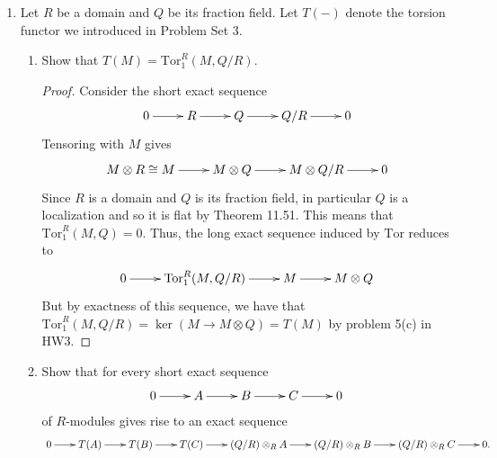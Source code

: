 \documentclass[11pt,oneside,english]{amsart}
\theoremstyle{definition}
\newcommand{\lspace}{\vspace{5mm}}
\newcommand{\Tor}{\text{Tor}}
\begin{document}
\rightline{\today}

\lspace




\begin{enumerate}[leftmargin=*]
\itemsep5mm


\item Let $R$ be a domain and $Q$ be its fraction field. Let $T(-)$ denote the torsion functor we introduced in Problem Set 3. 
\begin{enumerate}
\item Show that $T(M) = \Tor_1^R(M,Q/R)$.%

\begin{proof}
Consider the short exact sequence
\[
\xymatrix{0 \ar[r] & R \ar[r] & Q \ar[r] & Q/R \ar[r] & 0}
\]
Tensoring with $M$ gives
\[
\xymatrix{M\otimes R\cong M \ar[r] & M\otimes Q \ar[r] & M\otimes Q/R \ar[r] & 0}
\]
Since $R$ is a domain and $Q$ is its fraction field, in particular $Q$ is a localization and so it is flat by Theorem 11.51. This means that $\Tor_1^R(M,Q)=0$. Thus, the long exact sequence induced by $\Tor$ reduces to 
\[
\xymatrix{0 \ar[r] & \Tor_1^R(M,Q/R) \ar[r] & M \ar[r] & M\otimes Q}
\]
But by exactness of this sequence, we have that $\Tor_1^R(M,Q/R)=\ker(M\to M\otimes Q)=T(M)$ by problem 5(c) in HW3.
\end{proof}

\item Show that for every short exact sequence
\[
\xymatrix{0 \ar[r] & A \ar[r] & B \ar[r] & C \ar[r] & 0}
\]
of $R$-modules gives rise to an exact sequence%
\[
\xymatrix@C=7mm{0 \ar[r] & T(A) \ar[r] & T(B) \ar[r] & T(C) \ar[r] & (Q/R) \otimes_R A \ar[r] & (Q/R) \otimes_R B \ar[r] & (Q/R) \otimes_R C \ar[r] & 0.}
\]


\end{enumerate}
\end{enumerate}
\end{document}
